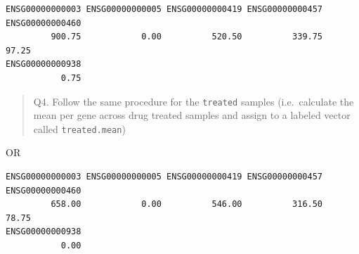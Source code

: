 \documentclass[
  letterpaper,
  DIV=11,
  numbers=noendperiod]{scrartcl}
\newenvironment{Shaded}{\begin{snugshade}}{\end{snugshade}}
\newcommand{\CommentTok}[1]{\textcolor[rgb]{0.37,0.37,0.37}{#1}}
\newcommand{\DecValTok}[1]{\textcolor[rgb]{0.68,0.00,0.00}{#1}}
\newcommand{\FunctionTok}[1]{\textcolor[rgb]{0.28,0.35,0.67}{#1}}
\newcommand{\NormalTok}[1]{\textcolor[rgb]{0.00,0.23,0.31}{#1}}
\newcommand{\OtherTok}[1]{\textcolor[rgb]{0.00,0.23,0.31}{#1}}
\newcommand{\SpecialCharTok}[1]{\textcolor[rgb]{0.37,0.37,0.37}{#1}}
\newcommand{\StringTok}[1]{\textcolor[rgb]{0.13,0.47,0.30}{#1}}
\begin{document}
\begin{verbatim}
ENSG00000000003 ENSG00000000005 ENSG00000000419 ENSG00000000457 ENSG00000000460 
         900.75            0.00          520.50          339.75           97.25 
ENSG00000000938 
           0.75 
\end{verbatim}

\begin{quote}
Q4. Follow the same procedure for the \texttt{treated} samples
(i.e.~calculate the mean per gene across drug treated samples and assign
to a labeled vector called \texttt{treated.mean})
\end{quote}

\begin{Shaded}
\end{Shaded}

OR

\begin{Shaded}
\end{Shaded}

\begin{verbatim}
ENSG00000000003 ENSG00000000005 ENSG00000000419 ENSG00000000457 ENSG00000000460 
         658.00            0.00          546.00          316.50           78.75 
ENSG00000000938 
           0.00 
\end{verbatim}
\end{document}

